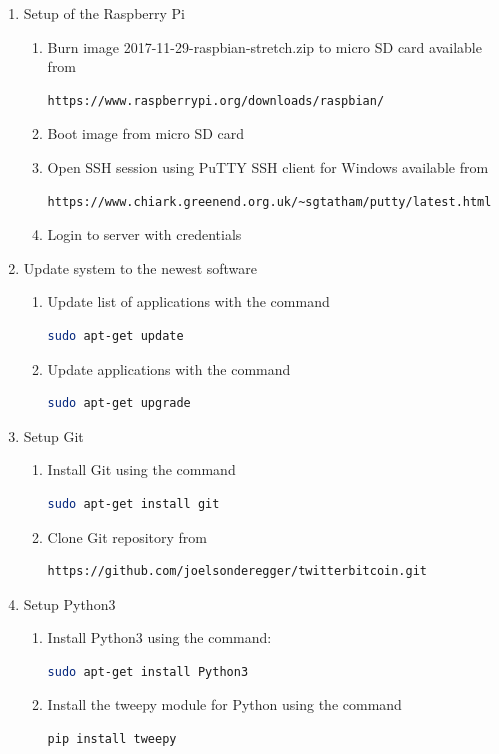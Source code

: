 \documentclass[a4paper,12pt]{article}
\begin{document}
\begin{spacing}{1.2}
\begin{enumerate}

\item Setup of the Raspberry Pi
\begin{enumerate}
\item Burn image 2017-11-29-raspbian-stretch.zip to micro SD card available from
\begin{lstlisting}[language=bash]
https://www.raspberrypi.org/downloads/raspbian/
\end{lstlisting}
\item Boot image from micro SD card 
\item Open SSH session using PuTTY SSH client for Windows available from
\begin{lstlisting}[language=bash] 
https://www.chiark.greenend.org.uk/~sgtatham/putty/latest.html
\end{lstlisting}
\item Login to server with credentials 
\end{enumerate}

\item Update system to the newest software
\begin{enumerate}
\item Update list of applications with the command
\begin{lstlisting}[language=bash]
sudo apt-get update
\end{lstlisting}
\item Update applications with the command
\begin{lstlisting}[language=bash]
sudo apt-get upgrade
\end{lstlisting}
\end{enumerate}

\item Setup Git
\begin{enumerate}
\item Install Git using the command
\begin{lstlisting}[language=bash]
 sudo apt-get install git
\end{lstlisting}
\item Clone Git repository from
\begin{lstlisting}[language=bash] 
https://github.com/joelsonderegger/twitterbitcoin.git
\end{lstlisting}
\end{enumerate}

\item Setup Python3
\begin{enumerate}
\item Install Python3 using the command: \begin{lstlisting}[language=bash]
sudo apt-get install Python3
\end{lstlisting}
\item Install the tweepy module for Python using the command
\begin{lstlisting}[language=bash]
pip install tweepy
\end{lstlisting}
\end{enumerate}


\end{enumerate}
\end{spacing}
\end{document}
